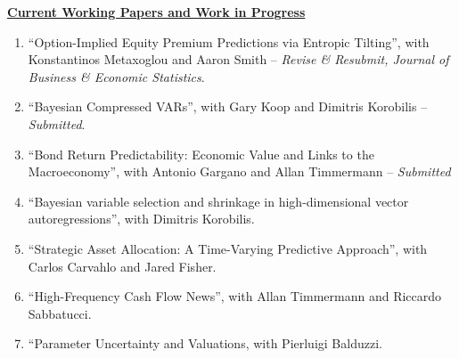 \documentclass[12pt]{article}
\begin{document}
\underline{\textbf{Current Working Papers and Work in Progress}}
\begin{enumerate}
	\setcounter{enumi}{\theenumTemp}
	\item ``Option-Implied Equity Premium Predictions via Entropic Tilting'', with Konstantinos Metaxoglou  and Aaron Smith -- \textit{Revise \& Resubmit, Journal of Business \& Economic Statistics}.
	\item ``Bayesian Compressed VARs'', with Gary Koop and Dimitris Korobilis -- \textit{Submitted}.
	\item ``Bond Return Predictability: Economic Value and Links to the Macroeconomy'', with Antonio Gargano and Allan Timmermann -- \textit{Submitted}
	\item ``Bayesian variable selection and shrinkage in high-dimensional vector autoregressions'', with Dimitris Korobilis.
	\item ``Strategic Asset Allocation: A Time-Varying Predictive Approach'', with Carlos Carvahlo and Jared Fisher.
	\item ``High-Frequency Cash Flow News'', with Allan Timmermann and Riccardo Sabbatucci.
	\item ``Parameter Uncertainty and Valuations, with Pierluigi Balduzzi.
	
\end{enumerate}
\end{document}
